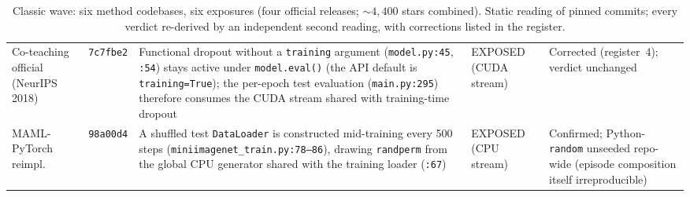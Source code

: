 \documentclass[10pt,letterpaper]{article}
\theoremstyle{remark}
\newcommand{\code}[1]{\texttt{#1}}
\begin{document}
\begin{table}[tbp]
\begin{tabular}{@{}L{2.5cm}L{1.15cm}L{5.95cm}L{1.9cm}L{3.5cm}@{}}
\addlinespace
Co-teaching official (NeurIPS 2018) & \code{7c7fbe2} &
Functional dropout without a \code{training} argument (\code{model.py:45},
\code{:54}) stays active under \code{model.eval()} (the API default is
\code{training=True}); the per-epoch test evaluation (\code{main.py:295})
therefore consumes the CUDA stream shared with training-time dropout &
EXPOSED (CUDA stream) &
Corrected (register~4); verdict unchanged \\
\addlinespace
MAML-PyTorch reimpl. & \code{98a00d4} &
A shuffled test \code{DataLoader} is constructed mid-training every 500
steps (\code{miniimagenet\_train.py:78--86}), drawing \code{randperm} from
the global CPU generator shared with the training loader (\code{:67}) &
EXPOSED (CPU stream) &
Confirmed; Python-\code{random} unseeded repo-wide (episode composition
itself irreproducible) \\
\bottomrule
\end{tabular}
\caption{Classic wave: six method codebases, six exposures (four official
releases; ${\sim}4{,}400$ stars combined). Static reading of pinned
commits; every verdict re-derived by an independent second reading, with
corrections listed in the register.}
\label{tab:classic}
\end{table}
\end{document}
